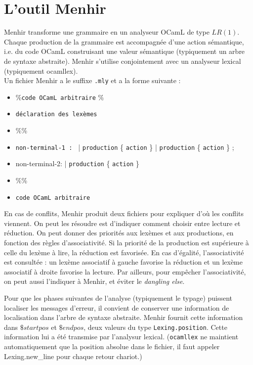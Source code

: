 \documentclass{cours}
\begin{document}
\section{L'outil Menhir}
Menhir transforme une grammaire en un analyseur OCamL de type $LR(1)$. Chaque production de la grammaire est accompagnée d'une action sémantique, i.e. du code OCamL construisant une valeur sémantique (typiquement un arbre de syntaxe abstraite). Menhir s'utilise conjointement avec un analyseur lexical (typiquement \textrm{ocamllex}).\\
Un fichier Menhir a le suffixe \texttt{.mly} et a la forme suivante :
\begin{itemize}
    \item \%{\texttt{code OCamL arbitraire} \%}
    \item \texttt{déclaration des lexèmes}
    \item \%\%
    \item \texttt{non-terminal-1 : }
          | \texttt{production} \{ \texttt{action} \}
          | \texttt{production} \{ \texttt{action} \}
          ;
    \item non-terminal-2:
          | \texttt{production} \{ \texttt{action} \}
    \item \%\%
    \item \texttt{code OCamL arbitraire}
\end{itemize}
En cas de conflits, Menhir produit deux fichiers pour expliquer d'où les conflits viennent. On peut les résoudre est d'indiquer comment choisir entre lecture et réduction. On peut donner des priorités aux lexèmes et aux productions, en fonction des règles d'associativité. Si la priorité de la production est supérieure à celle du lexème à lire, la réduction est favorisée. En cas d'égalité, l'associativité est consultée : un lexème associatif à gauche favorise la réduction et un lexème associatif à droite favorise la lecture. Par ailleurs, pour empêcher l'associativité, on peut aussi l'indiquer à Menhir, et éviter le \textit{dangling else}.

Pour que les phases suivantes de l'analyse (typiquement le typage) puissent localiser les messages d'erreur, il convient de conserver une information de localisation dans l'arbre de syntaxe abstraite. Menhir fournit cette information dans $\$startpos$ et $\$endpos$, deux valeurs du type \texttt{Lexing.position}. Cette information lui a été transmise par l'analysur lexical. (\texttt{ocamllex} ne maintient automatiquement que la position absolue dans le fichier, il faut appeler Lexing.new\_line pour chaque retour chariot.)
\end{document}
